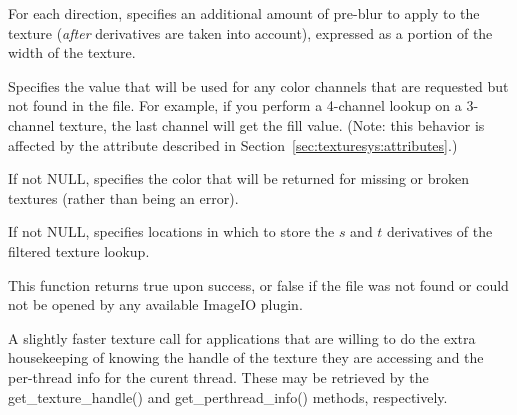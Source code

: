 \vspace{-24pt}
\vspace{10pt}
For each direction, specifies an additional amount of pre-blur to apply
to the texture (\emph{after} derivatives are taken into account),
expressed as a portion of the width of the texture.
\apiend

\vspace{-24pt}
\vspace{10pt}
Specifies the value that will be used for any color channels that are
requested but not found in the file.  For example, if you perform a
4-channel lookup on a 3-channel texture, the last channel will
get the fill value.  (Note: this behavior is affected by the
 attribute described in 
Section~\ref{sec:texturesys:attributes}.)
\apiend

\vspace{-24pt}
\vspace{10pt}
If not NULL, specifies the color that will be returned for missing or
broken textures (rather than being an error).
\apiend

\vspace{-24pt}
\vspace{10pt}
If not NULL, specifies locations in which to store the $s$ and $t$
derivatives of the filtered texture lookup.
\apiend

This function returns {\cf true} upon success, or {\cf false} if the
file was not found or could not be opened by any available ImageIO
plugin.
\apiend


A slightly faster {\cf texture} call for applications that are willing
to do the extra housekeeping of knowing the handle of the texture they
are accessing and the per-thread info for the curent thread.  These
may be retrieved by the {\cf get_texture_handle()} and 
{\cf get_perthread_info()} methods, respectively.
\apiend


